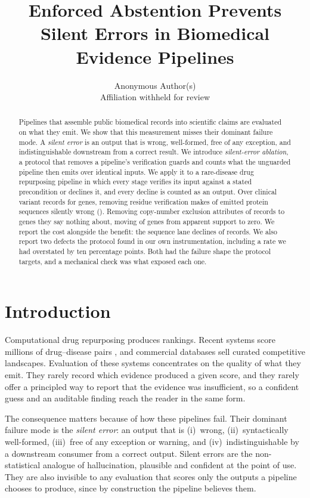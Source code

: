 \documentclass{article}
\title{Enforced Abstention Prevents Silent Errors in Biomedical Evidence
Pipelines}
\author{Anonymous Author(s)\\Affiliation withheld for review}
\date{}
\begin{document}
\maketitle

\begin{abstract}
Pipelines that assemble public biomedical records into scientific claims are
evaluated on what they emit. We show that this measurement misses their
dominant failure mode. A \emph{silent error} is an output that is wrong,
well-formed, free of any exception, and indistinguishable downstream from a
correct result. We introduce \emph{silent-error ablation}, a protocol that
removes a pipeline's verification guards and counts what the unguarded
pipeline then emits over identical inputs. We apply it to a rare-disease drug
repurposing pipeline in which every stage verifies its input against a stated
precondition or declines it, and every decline is counted as an output. Over
\CorpusFetched{} clinical variant records for \NumGenes{} genes, removing
residue verification makes \GOneWrong{} of \GOneNaive{} emitted protein
sequences silently wrong (\GOneRate{}). Removing copy-number exclusion
attributes \GTwoWrong{} of \GTwoNaive{} records to genes they say nothing
about, moving \GTwoZeroed{} of \NumGenes{} genes from apparent support to
zero. We report the cost alongside the benefit: the sequence lane declines
\SeqDeclined{} of \GOneProcessed{} records. We also report two defects the
protocol found in our own instrumentation, including a rate we had overstated
by ten percentage points. Both had the failure shape the protocol targets, and
a mechanical check was what exposed each one.
\end{abstract}

\section{Introduction}

Computational drug repurposing produces rankings. Recent systems score
millions of drug--disease pairs \citep{txgnn}, and commercial databases sell
curated competitive landscapes. Evaluation of these systems concentrates on
the quality of what they emit. They rarely record which evidence produced a
given score, and they rarely offer a principled way to report that the
evidence was insufficient, so a confident guess and an auditable finding reach
the reader in the same form.

The consequence matters because of how these pipelines fail. Their dominant
failure mode is the \emph{silent error}: an output that is (i)~wrong,
(ii)~syntactically well-formed, (iii)~free of any exception or warning, and
(iv)~indistinguishable by a downstream consumer from a correct output. Silent
errors are the non-statistical analogue of hallucination, plausible and
confident at the point of use. They are also invisible to any evaluation that
scores only the outputs a pipeline chooses to produce, since by construction
the pipeline believes them.
\end{document}
